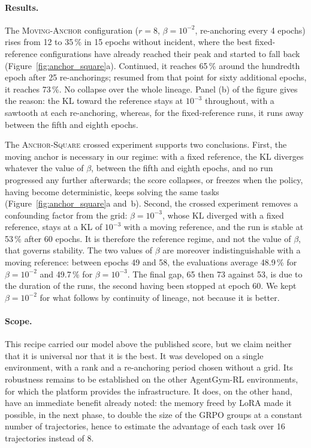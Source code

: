 \documentclass[11pt,a4paper]{article}
\begin{document}
\paragraph{Results.} The \textsc{Moving-Anchor} configuration ($r=8$, $\beta=10^{-2}$, re-anchoring every 4 epochs) rises from 12 to 35\,\% in 15 epochs without incident, where the best fixed-reference configurations have already reached their peak and started to fall back (Figure~\ref{fig:anchor_square}a). Continued, it reaches 65\,\% around the hundredth epoch after 25 re-anchorings; resumed from that point for sixty additional epochs, it reaches 73\,\%. No collapse over the whole lineage. Panel (b) of the figure gives the reason: the KL toward the reference stays at $10^{-3}$ throughout, with a sawtooth at each re-anchoring, whereas, for the fixed-reference runs, it runs away between the fifth and eighth epochs.

The \textsc{Anchor-Square} crossed experiment supports two conclusions. First, the moving anchor is necessary in our regime: with a fixed reference, the KL diverges whatever the value of $\beta$, between the fifth and eighth epochs, and no run progressed any further afterwards; the score collapses, or freezes when the policy, having become deterministic, keeps solving the same tasks (Figure~\ref{fig:anchor_square}a and~b). Second, the crossed experiment removes a confounding factor from the grid: $\beta = 10^{-3}$, whose KL diverged with a fixed reference, stays at a KL of $10^{-3}$ with a moving reference, and the run is stable at 53\,\% after 60 epochs. It is therefore the reference regime, and not the value of $\beta$, that governs stability. The two values of $\beta$ are moreover indistinguishable with a moving reference: between epochs 49 and 58, the evaluations average 48.9\,\% for $\beta=10^{-2}$ and 49.7\,\% for $\beta=10^{-3}$. The final gap, 65 then 73 against 53, is due to the duration of the runs, the second having been stopped at epoch 60. We kept $\beta=10^{-2}$ for what follows by continuity of lineage, not because it is better.

\paragraph{Scope.} This recipe carried our model above the published score, but we claim neither that it is universal nor that it is the best. It was developed on a single environment, with a rank and a re-anchoring period chosen without a grid. Its robustness remains to be established on the other AgentGym-RL environments, for which the platform provides the infrastructure. It does, on the other hand, have an immediate benefit already noted: the memory freed by LoRA made it possible, in the next phase, to double the size of the GRPO groups at a constant number of trajectories, hence to estimate the advantage of each task over 16 trajectories instead of 8.
\end{document}
